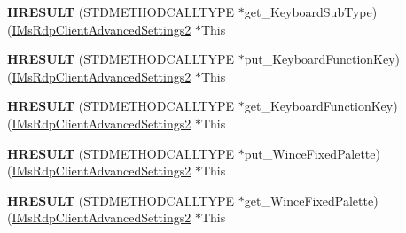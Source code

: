 \begin{DoxyCompactItemize}
\item 
\mbox{\label{struct_m_s_t_s_c_lib_1_1_i_ms_rdp_client_advanced_settings2_vtbl_a6d15bb7446471b9fddd6f2195cde7843}} 
{\bfseries H\+R\+E\+S\+U\+LT} (S\+T\+D\+M\+E\+T\+H\+O\+D\+C\+A\+L\+L\+T\+Y\+PE $\ast$get\+\_\+\+Keyboard\+Sub\+Type)(\hyperlink{interface_m_s_t_s_c_lib_1_1_i_ms_rdp_client_advanced_settings2}{I\+Ms\+Rdp\+Client\+Advanced\+Settings2} $\ast$This
\item 
\mbox{\label{struct_m_s_t_s_c_lib_1_1_i_ms_rdp_client_advanced_settings2_vtbl_a2f9cd11d1a20602a8bb6992ae5289295}} 
{\bfseries H\+R\+E\+S\+U\+LT} (S\+T\+D\+M\+E\+T\+H\+O\+D\+C\+A\+L\+L\+T\+Y\+PE $\ast$put\+\_\+\+Keyboard\+Function\+Key)(\hyperlink{interface_m_s_t_s_c_lib_1_1_i_ms_rdp_client_advanced_settings2}{I\+Ms\+Rdp\+Client\+Advanced\+Settings2} $\ast$This
\item 
\mbox{\label{struct_m_s_t_s_c_lib_1_1_i_ms_rdp_client_advanced_settings2_vtbl_adcd2a38aeb7d30d548996ff562271178}} 
{\bfseries H\+R\+E\+S\+U\+LT} (S\+T\+D\+M\+E\+T\+H\+O\+D\+C\+A\+L\+L\+T\+Y\+PE $\ast$get\+\_\+\+Keyboard\+Function\+Key)(\hyperlink{interface_m_s_t_s_c_lib_1_1_i_ms_rdp_client_advanced_settings2}{I\+Ms\+Rdp\+Client\+Advanced\+Settings2} $\ast$This
\item 
\mbox{\label{struct_m_s_t_s_c_lib_1_1_i_ms_rdp_client_advanced_settings2_vtbl_ac193ade218512494b944bb76ea85abee}} 
{\bfseries H\+R\+E\+S\+U\+LT} (S\+T\+D\+M\+E\+T\+H\+O\+D\+C\+A\+L\+L\+T\+Y\+PE $\ast$put\+\_\+\+Wince\+Fixed\+Palette)(\hyperlink{interface_m_s_t_s_c_lib_1_1_i_ms_rdp_client_advanced_settings2}{I\+Ms\+Rdp\+Client\+Advanced\+Settings2} $\ast$This
\item 
\mbox{\label{struct_m_s_t_s_c_lib_1_1_i_ms_rdp_client_advanced_settings2_vtbl_a2a8ada8375083b9346fbfc07c8089800}} 
{\bfseries H\+R\+E\+S\+U\+LT} (S\+T\+D\+M\+E\+T\+H\+O\+D\+C\+A\+L\+L\+T\+Y\+PE $\ast$get\+\_\+\+Wince\+Fixed\+Palette)(\hyperlink{interface_m_s_t_s_c_lib_1_1_i_ms_rdp_client_advanced_settings2}{I\+Ms\+Rdp\+Client\+Advanced\+Settings2} $\ast$This

\end{DoxyCompactItemize}
